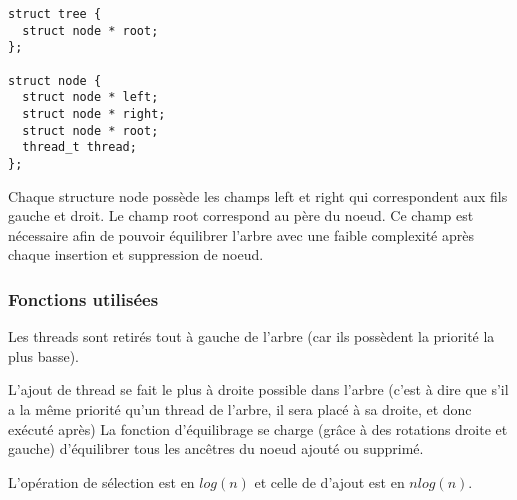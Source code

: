 \begin{verbatim}
struct tree {
  struct node * root;
};

struct node {
  struct node * left;
  struct node * right;
  struct node * root;
  thread_t thread; 
};

\end{verbatim}

Chaque structure node possède les champs left et right qui
correspondent aux fils gauche et droit. Le champ root correspond au
père du noeud. Ce champ est nécessaire afin de pouvoir équilibrer
l'arbre avec une faible complexité après chaque insertion et
suppression de noeud.

\subsubsection{Fonctions utilisées}
Les threads sont retirés tout à gauche de l'arbre (car ils possèdent
la priorité la plus basse).

L'ajout de thread se fait le plus à droite possible dans l'arbre
(c'est à dire que s'il a la même priorité qu'un thread de l'arbre, il
sera placé à sa droite, et donc exécuté après) La fonction
d'équilibrage se charge (grâce à des rotations droite et gauche)
d'équilibrer tous les ancêtres du noeud ajouté ou supprimé.

L'opération de sélection est en $log(n)$ et celle de d'ajout est en
$nlog(n)$.
